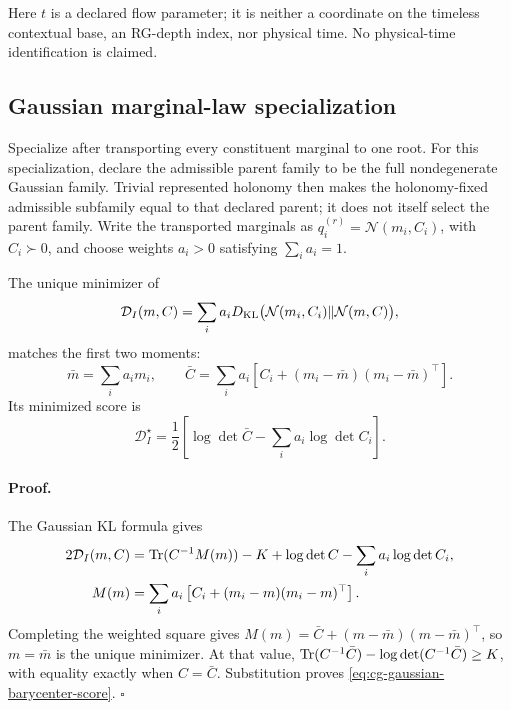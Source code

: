 Here \(t\) is a declared flow parameter; it is neither a coordinate on the
timeless contextual base, an RG-depth index, nor physical time. No
physical-time identification is claimed. 

\subsection{Gaussian marginal-law specialization}
\label{sec:cg-gaussian-marginal-law}

Specialize  after transporting every
constituent marginal to one root. For this specialization, declare the
admissible parent family to be the full nondegenerate Gaussian family.
Trivial represented holonomy then makes the holonomy-fixed admissible
subfamily equal to that declared parent; it does not itself select the parent
family. Write the transported marginals as
\(q_i^{(r)}=\mathcal N(m_i,C_i)\), with \(C_i\succ0\), and choose weights
\(a_i>0\) satisfying \(\sum_i a_i=1\). 

The unique minimizer of
\begin{equation}
\mathcal D_I(m,C)
=\sum_i a_iD_{\mathrm{KL}}\bigl(\mathcal N(m_i,C_i)
\Vert\mathcal N(m,C)\bigr),
\label{eq:cg-gaussian-barycenter-objective}
\end{equation}
matches the first two moments:
\begin{equation}
\bar m=\sum_i a_im_i,\qquad
\bar C=\sum_i a_i\left[C_i+(m_i-\bar m)(m_i-\bar m)^\top\right].
\label{eq:cg-gaussian-barycenter-moments}
\end{equation}
Its minimized score is
\begin{equation}
\mathcal D_I^\star
=\frac12\left[
\log\det\bar C-\sum_i a_i\log\det C_i
\right].
\label{eq:cg-gaussian-barycenter-score}
\end{equation}

\paragraph{Proof.}
The Gaussian KL formula gives
\begin{equation}
\begin{aligned}
2\mathcal D_I(m,C)
&=\operatorname{Tr}(C^{-1}M(m))-K+\log\det C
-\sum_i a_i\log\det C_i,\\
M(m)&=\sum_i a_i\left[C_i+(m_i-m)(m_i-m)^\top\right].
\end{aligned}
\label{eq:cg-gaussian-barycenter-expansion}
\end{equation}
Completing the weighted square gives
\(M(m)=\bar C+(m-\bar m)(m-\bar m)^\top\), so \(m=\bar m\) is the unique
minimizer. At that value,
\(\operatorname{Tr}(C^{-1}\bar C)-\log\det(C^{-1}\bar C)\geq K\), with equality exactly
when \(C=\bar C\). Substitution proves
\eqref{eq:cg-gaussian-barycenter-score}. \(\square\)

